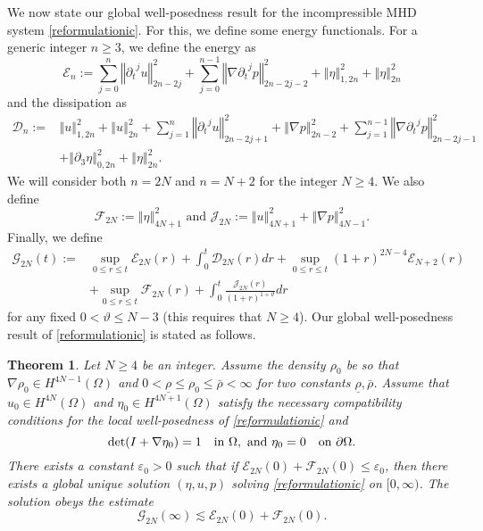 \documentclass[a4paper,reqno,11pt]{amsart}
\newtheorem{theorem}{Theorem}[section]
\numberwithin{equation}{section}
\providecommand{\norm}[1]{\left\Vert#1\right\Vert}
\providecommand{\sd}[1]{\mathcal{D}_{#1}}
\providecommand{\se}[1]{\mathcal{E}_{#1}}
\providecommand{\ns}[1]{\norm{#1}^2}
\providecommand{\norm}[1]{\left\Vert#1\right\Vert}
\begin{document}
We now state our global well-posedness result for the incompressible MHD system \eqref{reformulationic}. For this, we define some energy functionals. For a generic integer $n\ge 3$, we define the energy as
\begin{equation}\label{p_energy_def}
 \se{n} := \sum_{j=0}^{n}  \ns{{\partial_t}^j u}_{2n-2j} + \sum_{j=0}^{n-1}  \ns{\nabla {\partial_t}^j p}_{2n-2j-2}
+\ns{ \eta}_{1,2n }+\ns{ \eta}_{2n }
\end{equation}
and the dissipation as
\begin{equation}\label{p_dissipation_def}
\begin{split}
 \sd{n} :=& \ns{ u}_{1,2n }+ \ns{ u}_{2n }+ \sum_{j=1}^{n}  \ns{{\partial_t}^j u}_{2n-2j+1}
+\ns{ \nabla p}_{2n-2 }+ \sum_{j=1}^{n-1}  \ns{\nabla {\partial_t}^j p}_{2n-2j-1}
\\&+\ns{{\partial}_3  \eta}_{0,2n }+\ns{ \eta}_{2n }.
\end{split}
\end{equation}
We will consider both $n=2N$ and $n=N+2$ for the integer $N\ge 4$.  We also define
\begin{equation}\label{fff}
{\mathcal{F}_{2N}}:=  \ns{\eta}_{4N+1}\text{ and }\mathcal{J}_{2N}:=\ns{u}_{4N+1}+\ns{ \nabla p}_{4N-1}.
\end{equation}
Finally, we define
\begin{equation}\label{G_def}
\begin{split}
\mathcal{G}_{2N}(t) :=& \sup_{0 \le r \le t} \se{2N} (r) + \int_0^t \sd{2N} (r) dr + \sup_{0 \le r \le t} (1+r)^{2N-4} \se{N+2} (r)
\\&+ \sup_{0 \le r \le t} {\mathcal{F}_{2N}}(r)  + \int_0^t \frac{  \mathcal{J}_{2N}(r)}{(1+r)^{1+\vartheta}}dr
\end{split}
\end{equation}
for any fixed $0<\vartheta\le N-3$ (this requires that $N\ge 4$). Our global well-posedness result of \eqref{reformulationic} is stated as follows.
\begin{theorem}\label{thic}
Let $N\ge 4$ be an integer. Assume the density $\rho_0$ be so that $\nabla\rho_0\in H^{4N-1}(\Omega)$ and $0<\underline{\rho}\le \rho_0\le \bar{\rho}<\infty$ for two constants $\underline{\rho}, \bar{\rho}$. Assume that $u_0\in H^{4N}(\Omega)$ and $\eta_0\in H^{4N+1}(\Omega)$ satisfy the necessary compatibility conditions for the local well-posedness of \eqref{reformulationic} and
\begin{equation}
 {\rm det} (I+\nabla\eta_0)=1\quad \text{in }\Omega,\text{ and }
\eta_0=0\quad\text{on }{\partial}\Omega.
\end{equation}
There exists a constant $\varepsilon_0>0$ such that if $\se{2N} (0) + {\mathcal{F}_{2N}}(0) \le \varepsilon_0$, then there exists a global unique solution $(\eta,u,p)$ solving  \eqref{reformulationic} on $[0,\infty)$. The solution obeys the estimate
\begin{equation}
\mathcal{G}_{2N}(\infty) {\lesssim} \se{2N} (0) + {\mathcal{F}_{2N}}(0).
\end{equation}
\end{theorem}
\end{document}
